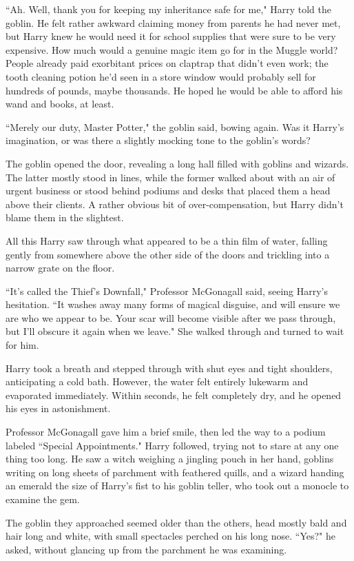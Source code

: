 ``Ah. Well, thank you for keeping my inheritance safe for me," Harry told the goblin. He felt rather awkward claiming money from parents he had never met, but Harry knew he would need it for school supplies that were sure to be very expensive. How much would a genuine magic item go for in the Muggle world? People already paid exorbitant prices on claptrap that didn't even work; the tooth cleaning potion he'd seen in a store window would probably sell for hundreds of pounds, maybe thousands. He hoped he would be able to afford his wand and books, at least.

``Merely our duty, Master Potter," the goblin said, bowing again. Was it Harry's imagination, or was there a slightly mocking tone to the goblin's words?

The goblin opened the door, revealing a long hall filled with goblins and wizards. The latter mostly stood in lines, while the former walked about with an air of urgent business or stood behind podiums and desks that placed them a head above their clients. A rather obvious bit of over-compensation, but Harry didn't blame them in the slightest.

All this Harry saw through what appeared to be a thin film of water, falling gently from somewhere above the other side of the doors and trickling into a narrow grate on the floor.

``It's called the Thief's Downfall," Professor McGonagall said, seeing Harry's hesitation. ``It washes away many forms of magical disguise, and will ensure we are who we appear to be. Your scar will become visible after we pass through, but I'll obscure it again when we leave." She walked through and turned to wait for him.

Harry took a breath and stepped through with shut eyes and tight shoulders, anticipating a cold bath. However, the water felt entirely lukewarm and evaporated immediately. Within seconds, he felt completely dry, and he opened his eyes in astonishment.

Professor McGonagall gave him a brief smile, then led the way to a podium labeled ``Special Appointments." Harry followed, trying not to stare at any one thing too long. He saw a witch weighing a jingling pouch in her hand, goblins writing on long sheets of parchment with feathered quills, and a wizard handing an emerald the size of Harry's fist to his goblin teller, who took out a monocle to examine the gem.

The goblin they approached seemed older than the others, head mostly bald and hair long and white, with small spectacles perched on his long nose. ``Yes?" he asked, without glancing up from the parchment he was examining.

